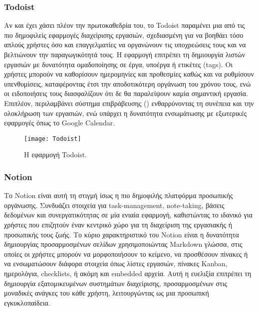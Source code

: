             \subsubsection{Todoist}
                Αν και έχει χάσει πλέον την πρωτοκαθεδρία του, το Todoist \cite{Todoist} παραμένει μια από τις πιο δημοφιλείς εφαρμογές διαχείρισης εργασιών, σχεδιασμένη για να βοηθάει τόσο απλούς χρήστες όσο και επαγγελματίες να οργανώνουν τις υποχρεώσεις τους και να βελτιώνουν την παραγωγικότητά τους. Η εφαρμογή επιτρέπει τη δημιουργία λιστών εργασιών με δυνατότητα ομαδοποίησης σε έργα, υποέργα ή ετικέτες (tags). Οι χρήστες μπορούν να καθορίσουν ημερομηνίες και προθεσμίες καθώς και να ρυθμίσουν υπενθυμίσεις, καταφέροντας έτσι την αποδοτικότερη οργάνωση του χρόνου τους, ενώ οι ειδοποιήσεις τους διασφαλίζουν ότι δε θα παραλείψουν καμία σημαντική εργασία. Επιπλέον, περιλαμβάνει σύστημα επιβράβευσης () ενθαρρύνοντας τη συνέπεια και την ολοκλήρωση των εργασιών, ενώ υπάρχει η δυνατότητα ενσωμάτωσης με εξωτερικές εφαρμογές όπως το Google Calendar.

                \begin{figure}[h!] \noindent \centering
                    \texttt{[image: Todoist]}
                    \caption{Η εφαρμογή Todoist.}
                \end{figure}


            \subsubsection{Notion}
                Το Notion \cite{Notion} είναι αυτή τη στιγμή ίσως η πιο δημοφιλής πλατφόρμα προσωπικής οργάνωσης. Συνδυάζει στοιχεία για task-management, note-taking, βάσεις δεδομένων και συνεργατικότητας σε μία ενιαία εφαρμογή, καθιστώντας το ιδανικό για χρήστες που επιζητούν έναν κεντρικό χώρο για τη διαχείριση της εργασιακής ή προσωπικής τους ζωής. Το κύριο χαρακτηριστικό του Notion είναι η δυνατότητα δημιουργίας προσαρμοσμένων σελίδων χρησιμοποιώντας Markdown γλώσσα, στις οποίες οι χρήστες μπορούν να μορφοποιήσουν το κείμενο, να προσθέσουν πίνακες ή να ενσωματώσουν διάφορα στοιχεία όπως λίστες εργασιών, πίνακες Kanban, ημερολόγια, checklists, ή ακόμη και embedded αρχεία. Αυτή η ευελιξία επιτρέπει τη δημιουργία εξατομικευμένων συστημάτων διαχείρισης, προσαρμοσμένων στις μοναδικές ανάγκες του κάθε χρήστη, λειτουργώντας ως μια προσωπική εγκυκλοπαίδεια.

